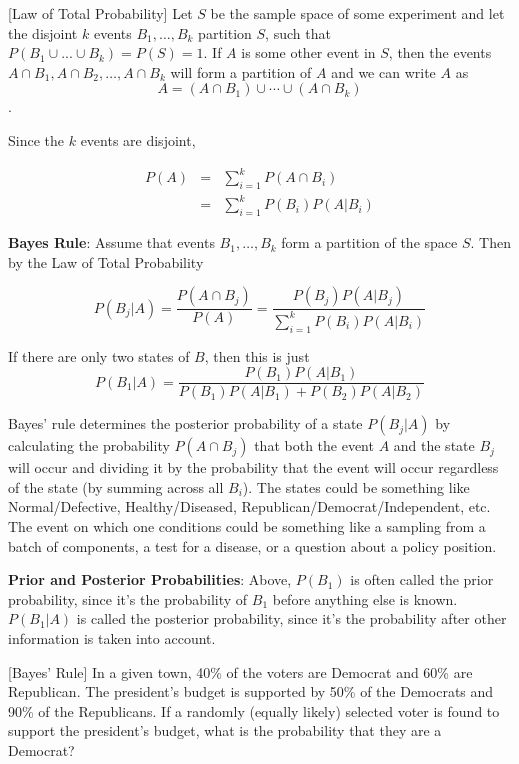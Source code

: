 \documentclass[]{book}
\theoremstyle{definition}
\theoremstyle{definition}
\theoremstyle{definition}
\theoremstyle{remark}
\begin{document}
[Law of Total Probability]
\protect\hypertarget{def:unnamed-chunk-69}{}{\label{def:unnamed-chunk-69} {} }Let \(S\) be the sample space of some experiment and let the disjoint \(k\) events \(B_1,\ldots,B_k\) partition \(S\), such that \(P(B_1\cup ... \cup B_k) = P(S) = 1\). If \(A\) is some other event in \(S\), then the events \(A\cap B_1, A\cap B_2, \ldots, A\cap B_k\) will form a partition of \(A\) and we can write \(A\) as \[A=(A\cap B_1)\cup\cdots\cup (A\cap B_k)\].

Since the \(k\) events are disjoint,

\begin{eqnarray*}
P(A)&=&\sum\limits_{i=1}^k P(A \cap B_i)\\
      &=&\sum\limits_{i=1}^k P(B_i)P(A|B_i)
\end{eqnarray*}

\textbf{Bayes Rule}: Assume that events \(B_1,\ldots,B_k\) form a partition of the space \(S\). Then by the Law of Total Probability

\[P(B_j|A)= \frac{P(A \cap B_j)} {P(A)} = \frac{P(B_j) P(A|B_j)}{\sum\limits_{i=1}^k P(B_i)P(A|B_i)}\]

If there are only two states of \(B\), then this is just
\[P(B_1|A)=\frac{P(B_1)P(A|B_1)} {P(B_1)P(A|B_1)+P(B_2)P(A|B_2)}\]

Bayes' rule determines the posterior probability of a state \(P(B_j|A)\) by calculating the probability \(P(A \cap B_j)\) that both the event \(A\) and the state \(B_j\) will occur and dividing it by the probability that the event will occur regardless of the state (by summing across all \(B_i\)). The states could be something like Normal/Defective, Healthy/Diseased, Republican/Democrat/Independent, etc. The event on which one conditions could be something like a sampling from a batch of components, a test for a disease, or a question about a policy position.

\textbf{Prior and Posterior Probabilities}: Above, \(P(B_1)\) is often called the prior probability, since it's the probability of \(B_1\) before anything else is known. \(P(B_1|A)\) is called the posterior probability, since it's the probability after other information is taken into account.

[Bayes' Rule]
\protect\hypertarget{exm:bayesrule}{}{\label{exm:bayesrule} {} }
In a given town, 40\% of the voters are Democrat and 60\% are Republican. The president's budget is supported by 50\% of the Democrats and 90\% of the Republicans. If a randomly (equally likely) selected voter is found to support the president's budget, what is the probability that they are a Democrat?
\end{document}
